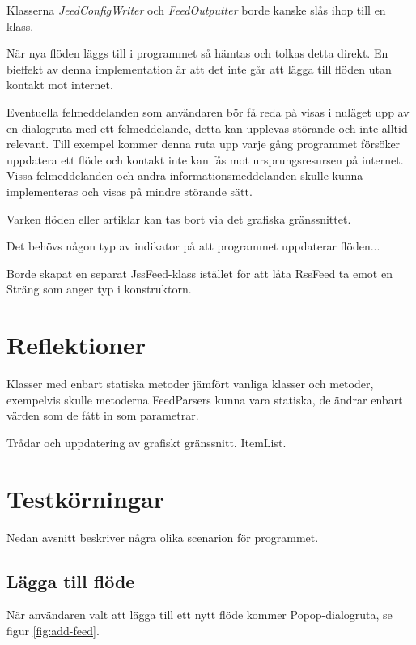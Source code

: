 \documentclass[a4paper, 12pt]{article}
\begin{document}
Klasserna \textit{JeedConfigWriter} och \textit{FeedOutputter} borde
kanske slås ihop till en klass.

När nya flöden läggs till i programmet så hämtas och tolkas detta
direkt. En bieffekt av denna implementation är att det inte går att
lägga till flöden utan kontakt mot internet.

Eventuella felmeddelanden som användaren bör få reda på visas i
nuläget upp av en dialogruta med ett felmeddelande, detta kan upplevas
störande och inte alltid relevant. Till exempel kommer denna ruta upp
varje gång programmet försöker uppdatera ett flöde och kontakt inte
kan fås mot ursprungsresursen på internet. Vissa felmeddelanden och
andra informationsmeddelanden skulle kunna implementeras och visas på
mindre störande sätt.

Varken flöden eller artiklar kan tas bort via det grafiska
gränssnittet.

Det behövs någon typ av indikator på att programmet uppdaterar
flöden...

Borde skapat en separat JssFeed-klass istället för att låta RssFeed ta
emot en Sträng som anger typ i konstruktorn.



\section{Reflektioner}\label{Reflektioner}

Klasser med enbart statiska metoder jämfört vanliga klasser och
metoder, exempelvis skulle metoderna FeedParsers kunna vara statiska,
de ändrar enbart värden som de fått in som parametrar.

Trådar och uppdatering av grafiskt gränssnitt. ItemList.

\section{Testkörningar}\label{Testkorningar}

Nedan avsnitt beskriver några olika scenarion för programmet.

\subsection{Lägga till flöde}
När användaren valt att lägga till ett nytt flöde kommer
Popop-dialogruta, se figur \ref{fig:add-feed}.
\end{document}
